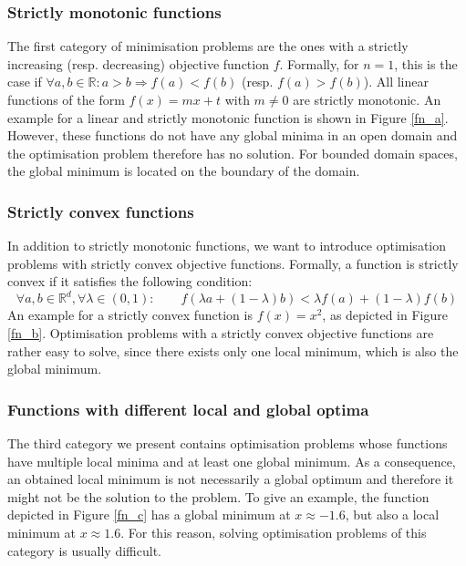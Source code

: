 \subsubsection{Strictly monotonic functions}
The first category of minimisation problems are the ones with a strictly increasing (resp. decreasing) objective function $f$. Formally, for $n = 1$, this is the case if $\forall a, b \in \mathbb{R}: a > b \Rightarrow f(a) < f(b)$ (resp. $f(a) > f(b)$). All linear functions of the form $f(x) = mx + t$ with $m \neq 0$ are strictly monotonic. An example for a linear and strictly monotonic function is shown in Figure \ref{fn_a}. However, these functions do not have any global minima in an open domain and the optimisation problem therefore has no solution. For bounded domain spaces, the global minimum is located on the boundary of the domain.
\subsubsection{Strictly convex functions}
In addition to strictly monotonic functions, we want to introduce optimisation problems with strictly convex objective functions. Formally, a function is strictly convex if it satisfies the following condition:
\[ \forall a, b \in \mathbb{R}^d, \forall \lambda \in (0, 1): \qquad f(\lambda a + (1 - \lambda) b) < \lambda f(a) + (1- \lambda)f(b) \]
An example for a strictly convex function is $f(x) = x^2$, as depicted in Figure \ref{fn_b}. Optimisation problems with a strictly convex objective functions are rather easy to solve, since there exists only one local minimum, which is also the global minimum.
\subsubsection{Functions with different local and global optima}
The third category we present contains optimisation problems whose functions have multiple local minima and at least one global minimum. As a consequence, an obtained local minimum is not necessarily a global optimum and therefore it might not be the solution to the problem. To give an example, the function depicted in Figure \ref{fn_c} has a global minimum at $x \approx -1.6$, but also a local minimum at $x \approx 1.6$. For this reason, solving optimisation problems of this category is usually difficult.\\
